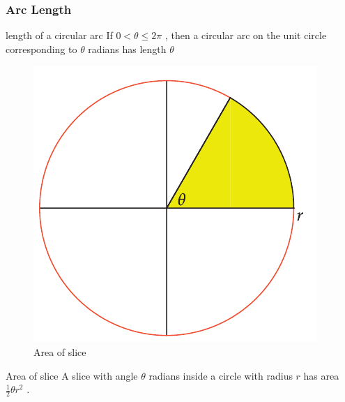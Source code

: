 \documentclass{beamer}
\begin{document}
\begin{frame}
    \frametitle{Arc Length}
    \begin{block}{length of a circular arc}
        If $0 < \theta \leq 2\pi$ , then a circular arc on the unit circle corresponding to $\theta$ radians
        has length $\theta$         
    \end{block}
\end{frame}

\begin{frame}
        \begin{figure}[h]    
            \begin{minipage}[b]{0.3\textwidth}
            \centering
            \includegraphics[scale=0.25]{7.png}
            \caption{Area of slice}
        \end{minipage}
    \end{figure}
    \begin{block}{Area of slice}
        A slice with angle $\theta$ radians inside a circle with radius $r$ has area $\frac{1}{2} \theta r^{2}$ .
    \end{block}
\end{frame}
\end{document}
